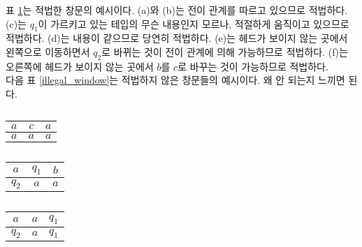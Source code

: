 \documentclass[b5paper, 10pt]{book}
\theoremstyle{definition}
\newenvironment{pf*}{\pushQED{\qed}\pf}{\popQED\endpf}
\begin{document}
\begin{pf*}
\begin{table}[!ht]
\begin{subtable}[h]{0.3\textwidth}
\begin{tabular}{ | c | c | c|}
            \hline
           \end{tabular}
           \caption{}
        \end{subtable}
         \caption{}
         \label{legal_window}
    \end{table}
    표 \ref{legal_window}는 적법한 창문의 예시이다. (a)와 (b)는 전이 관계를 따르고 있으므로 적법하다.
    (c)는 $q_1$이 가르키고 있는 테입의 무슨 내용인지 모르나, 적절하게 움직이고 있으므로 적법하다. 
    (d)는 내용이 같으므로 당연히 적법하다. (e)는 헤드가 보이지 않는 곳에서 왼쪽으로 이동하면서 $q_2$로 바뀌는 것이
    전이 관계에 의해 가능하므로 적법하다. (f)는 오른쪽에 헤드가 보이지 않는 곳에서 $b$를 $c$로 바꾸는 것이 가능하므로
    적법하다. \\ 
    다음 표 \ref{illegal_window}는 적법하지 않은 창문들의 예시이다. 왜 안 되는지 느끼면 된다. \\ 
    \begin{table}[!ht]
        \begin{subtable}[h]{0.3\textwidth}
            \centering
            \begin{tabular}{ | c | c | c|}
            \hline 
            $a$ & $c$ & $a$ \\ 
            \hline 
            $a$ & $a$ & $a$ \\ 
            \hline
           \end{tabular}
           \caption{}
        \end{subtable}
        \hfill
        \begin{subtable}[h]{0.3\textwidth}
            \centering
            \begin{tabular}{ | c | c | c|}
            \hline 
            $a$ & $q_1$ & $b$ \\ 
            \hline 
            $q_2$ & $a$ & $a$ \\ 
            \hline
           \end{tabular}
           \caption{}
        \end{subtable}
        \hfill
        \begin{subtable}[h]{0.3\textwidth}
            \centering
            \begin{tabular}{ | c | c | c|}
            \hline 
            $a$ & $a$ & $q_1$ \\ 
            \hline 
            $q_2$ & $a$ & $q_1$ \\ 
            \hline
           \end{tabular}
           \caption{}
        \end{subtable}

\end{table}
\end{pf*}
\end{document}
